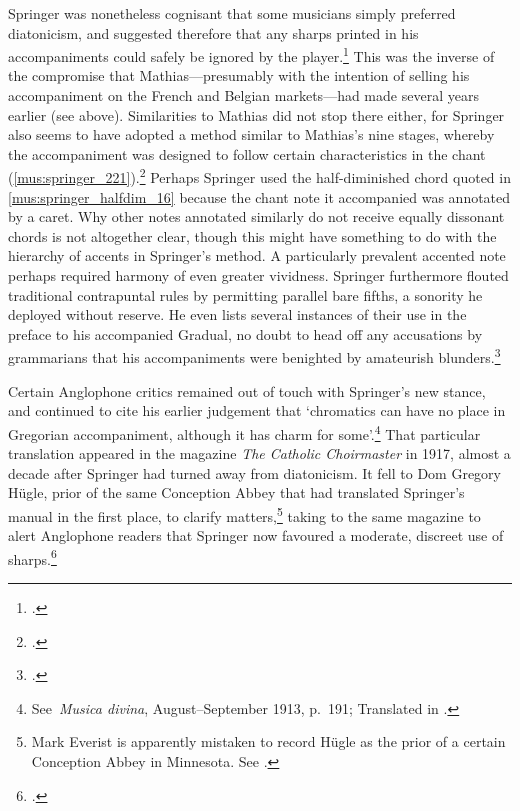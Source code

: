 Springer was nonetheless cognisant that some musicians simply preferred diatonicism, and suggested therefore that any sharps printed in his accompaniments could safely be ignored by the player.\footcite[p.~iii]{SpringerOrganumcomitansad1910}
This was the inverse of the compromise that Mathias---presumably with the intention of selling his accompaniment on the French and Belgian markets---had made several years earlier (see  above).
Similarities to Mathias did not stop there either, for Springer also seems to have adopted a method similar to Mathias's nine stages, whereby the accompaniment was designed to follow certain characteristics in the chant (\cref{mus:springer_221}).\footcite[pp.~x, 57--8, 221]{SpringerArtAccompanyingPlain1908}
Perhaps Springer used the half-diminished chord quoted in \cref{mus:springer_halfdim_16} because the chant note it accompanied was annotated by a caret.
Why other notes annotated similarly do not receive equally dissonant chords is not altogether clear, though this might have something to do with the hierarchy of accents in Springer's method.
A particularly prevalent accented note perhaps required harmony of even greater vividness.
Springer furthermore flouted traditional contrapuntal rules by permitting parallel bare fifths, a sonority he deployed without reserve.
He even lists several instances of their use in the preface to his accompanied Gradual, no doubt to head off any accusations by grammarians that his accompaniments were benighted by amateurish blunders.\footcite[pp.~v, 16]{SpringerOrganumcomitansad1910}

Certain Anglophone critics remained out of touch with Springer's new stance, and continued to cite his earlier judgement that `chromatics can have no place in Gregorian accompaniment, although it has charm for some'.\footnote{See~\covid{}\emph{Musica divina}, August--September 1913, p.~191; Translated in \cite[7]{UseChromaticsAccompaniment1917}.}
That particular translation appeared in the magazine \emph{The Catholic Choirmaster} in 1917, almost a decade after Springer had turned away from diatonicism.
It fell to Dom Gregory Hügle, prior of the same Conception Abbey that had translated Springer's manual in the first place, to clarify matters,\footnote{Mark Everist is apparently mistaken to record Hügle as the prior of a certain Conception Abbey in Minnesota. See \cite[140]{EveristMozartGhostsHaunting2012}.} taking to the same magazine to alert Anglophone readers that Springer now favoured a moderate, discreet use of sharps.\footcite[30]{HugleChromaticsUseAbuse1917}

